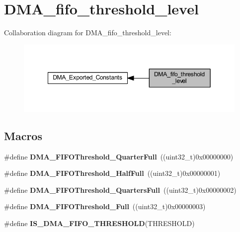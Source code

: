 \hypertarget{group___d_m_a__fifo__threshold__level}{}\section{D\+M\+A\+\_\+fifo\+\_\+threshold\+\_\+level}
\label{group___d_m_a__fifo__threshold__level}
Collaboration diagram for D\+M\+A\+\_\+fifo\+\_\+threshold\+\_\+level\+:\nopagebreak
\begin{figure}[H]
\begin{center}
\leavevmode
\includegraphics[width=349pt]{group___d_m_a__fifo__threshold__level}
\end{center}
\end{figure}
\subsection*{Macros}
\begin{DoxyCompactItemize}
\item 
\mbox{\label{group___d_m_a__fifo__threshold__level_gacc98384bbba43a9c4f70b448518acfe4}} 
\#define {\bfseries D\+M\+A\+\_\+\+F\+I\+F\+O\+Threshold\+\_\+Quarter\+Full}~((uint32\+\_\+t)0x00000000)
\item 
\mbox{\label{group___d_m_a__fifo__threshold__level_ga626b546865960343fdcfdf33ac8ceb03}} 
\#define {\bfseries D\+M\+A\+\_\+\+F\+I\+F\+O\+Threshold\+\_\+\+Half\+Full}~((uint32\+\_\+t)0x00000001)
\item 
\mbox{\label{group___d_m_a__fifo__threshold__level_ga6f041008fce4bb341f9a518d803a308b}} 
\#define {\bfseries D\+M\+A\+\_\+\+F\+I\+F\+O\+Threshold\+\_\+Quarters\+Full}~((uint32\+\_\+t)0x00000002)
\item 
\mbox{\label{group___d_m_a__fifo__threshold__level_ga9f1008e0df7d41d910ed89d7e0872e69}} 
\#define {\bfseries D\+M\+A\+\_\+\+F\+I\+F\+O\+Threshold\+\_\+\+Full}~((uint32\+\_\+t)0x00000003)
\item 
\#define {\bfseries I\+S\+\_\+\+D\+M\+A\+\_\+\+F\+I\+F\+O\+\_\+\+T\+H\+R\+E\+S\+H\+O\+LD}(T\+H\+R\+E\+S\+H\+O\+LD)
\end{DoxyCompactItemize}


